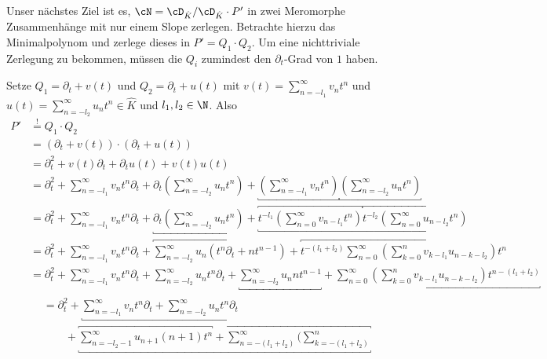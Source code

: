Unser nächstes Ziel ist es, $\cN=\cD_{\hat K}/\cD_{\hat K}\cdot P'$ in zwei
Meromorphe Zusammenhänge mit nur einem Slope zerlegen.  Betrachte hierzu das
Minimalpolynom und zerlege dieses in $P'=Q_1\cdot Q_2$.  Um eine nichttriviale
Zerlegung zu bekommen, müssen die $Q_i$ zumindest den $\partial_t$-Grad von $1$
haben.

\begin{try}
\begin{comment}
in \cite[Lem 1.14.]{ZulaBarbara} steht die obere schranke\\
Die $Q_i$ haben auch maximal den Grad $1$, da $\dots$\\
\end{comment}
Setze $Q_1=\partial_t+v(t)$ und $Q_2=\partial_t+u(t)$ mit
$v(t)=\sum_{n=-l_1}^\infty v_nt^n$ und $u(t)=\sum_{n=-l_2}^\infty u_nt^n \in
\hat K$ und $l_1,l_2\in\N$. Also
\begin{align*}
P'&\overset{!}{=} Q_1\cdot Q_2
\\&= (\partial_t+v(t))\cdot(\partial_t+u(t))
\\&= \partial_t^2+v(t)\partial_t + \partial_t u(t)+v(t)u(t)
\\&= \partial_t^2 + \sum_{n=-l_1}^\infty v_nt^n\partial_t
  + \partial_t (\sum_{n=-l_2}^\infty u_nt^n)
  + \underbracket{(\sum_{n=-l_1}^{\infty} v_{n}t^n)}
    \underbracket{(\sum_{n=-l_2}^{\infty} u_{n}t^n)}
\\&= \partial_t^2 + \sum_{n=-l_1}^\infty v_nt^n\partial_t
  + \underbracket{\partial_t (\sum_{n=-l_2}^\infty u_nt^n)}
  + \underbracket{
    \overbracket{t^{-l_1}(\sum_{n=0}^{\infty} v_{n-l_1}t^n)}
    \overbracket{t^{-l_2}(\sum_{n=0}^{\infty} u_{n-l_2}t^n)}
  }
\\&= \partial_t^2 +  \sum_{n=-l_1}^\infty v_nt^n\partial_t
  + \overbracket{\sum_{n=-l_2}^\infty u_n(t^n\partial_t+nt^{n-1})}
  + \overbracket{
    t^{-(l_1+l_2)}\sum_{n=0}^\infty(\sum_{k=0}^nv_{k-l_1}u_{n-k-l_2})t^n
  }
\\&= \partial_t^2 + \sum_{n=-l_1}^\infty v_nt^n\partial_t
  + \sum_{n=-l_2}^\infty u_nt^n\partial_t
  + \underbracket{\sum_{n=-l_2}^\infty u_nnt^{n-1}} + \underbracket{
  \sum_{n=0}^\infty(\sum_{k=0}^nv_{k-l_1}u_{n-k-l_2})t^{n-(l_1+l_2)}}
\\&\begin{aligned}
  &= \partial_t^2 
  +\underbracket{ \sum_{n=-l_1}^\infty v_nt^n\partial_t 
  + \sum_{n=-l_2}^\infty u_nt^n\partial_t}
\\&\qquad+ \underbracket{ \overbracket{\sum_{n=-l_2-1}^\infty
  u_{n+1}(n+1)t^{n}}
  + \overbracket{ \sum_{n=-(l_1+l_2)}^\infty(\sum_{k=-(l_1+l_2)}^{n}
}}
\end{aligned}
\end{align*}
\end{try}
